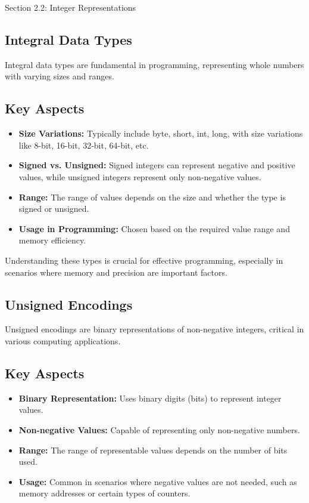 \begin{notes}{Section 2.2: Integer Representations}
    \subsection*{Integral Data Types}

    Integral data types are fundamental in programming, representing whole numbers with varying sizes and ranges. \vspace*{1em}
    
    \subsection*{Key Aspects}

    \begin{itemize}
        \item \textbf{Size Variations:} Typically include byte, short, int, long, with size variations like 8-bit, 16-bit, 32-bit, 64-bit, etc.
        \item \textbf{Signed vs. Unsigned:} Signed integers can represent negative and positive values, while unsigned integers represent only non-negative values.
        \item \textbf{Range:} The range of values depends on the size and whether the type is signed or unsigned.
        \item \textbf{Usage in Programming:} Chosen based on the required value range and memory efficiency.
    \end{itemize}
    
    Understanding these types is crucial for effective programming, especially in scenarios where memory and precision are important factors.

    \subsection*{Unsigned Encodings}

    Unsigned encodings are binary representations of non-negative integers, critical in various computing applications. \vspace*{1em}
    
    \subsection*{Key Aspects}

    \begin{itemize}
        \item \textbf{Binary Representation:} Uses binary digits (bits) to represent integer values.
        \item \textbf{Non-negative Values:} Capable of representing only non-negative numbers.
        \item \textbf{Range:} The range of representable values depends on the number of bits used.
        \item \textbf{Usage:} Common in scenarios where negative values are not needed, such as memory addresses or certain types of counters.
    \end{itemize}
    

\end{notes}

